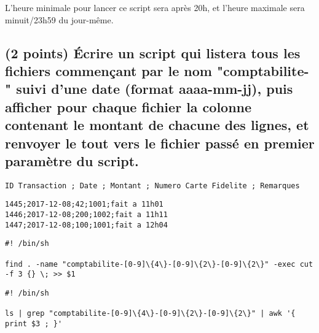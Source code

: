 \documentclass[11pt,a4paper]{article}
\begin{document}
L'heure minimale pour lancer ce script sera après 20h, et l'heure maximale sera minuit/23h59 du jour-même.

\bigskip

\subsection{(2 points) \'Ecrire un script qui listera tous les fichiers commençant par le nom "comptabilite-" suivi d'une date (format aaaa-mm-jj), puis afficher pour chaque fichier la colonne contenant le montant de chacune des lignes, et renvoyer le tout vers le fichier passé en premier paramètre du script.}

\bigskip

\lstset{language=sh}
\begin{lstlisting}[frame=single,title={Format des fichiers de transactions}]
ID Transaction ; Date ; Montant ; Numero Carte Fidelite ; Remarques
\end{lstlisting}

\lstset{language=sh}
\begin{lstlisting}[frame=single,title={comptabilite-2017-12-08}]
1445;2017-12-08;42;1001;fait a 11h01
1446;2017-12-08;200;1002;fait a 11h11
1447;2017-12-08;100;1001;fait a 12h04
\end{lstlisting}

\bigskip

\lstset{language=sh}
\begin{lstlisting}[frame=single,title={script.sh}]
#! /bin/sh

find . -name "comptabilite-[0-9]\{4\}-[0-9]\{2\}-[0-9]\{2\}" -exec cut -f 3 {} \; >> $1 
\end{lstlisting}

\lstset{language=sh}
\begin{lstlisting}[frame=single,title={script.sh}]
#! /bin/sh

ls | grep "comptabilite-[0-9]\{4\}-[0-9]\{2\}-[0-9]\{2\}" | awk '{ print $3 ; }'
\end{lstlisting}
\end{document}
